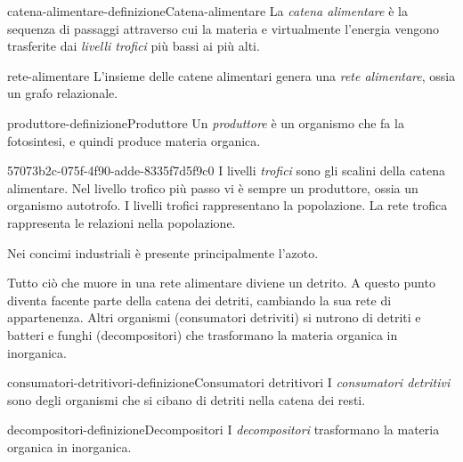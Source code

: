 \documentclass[preview]{standalone}
\begin{document}
\begin{snippetdefinition}{catena-alimentare-definizione}{Catena-alimentare}
    La \textit{catena alimentare} è la sequenza di passaggi
    attraverso cui la materia e virtualmente l'energia
    vengono trasferite dai \textit{livelli trofici} più bassi ai più alti.
\end{snippetdefinition}

\begin{snippet}{rete-alimentare}
    L'insieme delle catene alimentari genera una \textit{rete alimentare}, ossia un grafo relazionale.
\end{snippet}

\begin{snippetdefinition}{produttore-definizione}{Produttore}
    Un \textit{produttore} è un organismo che fa la fotosintesi, e quindi produce materia organica.
\end{snippetdefinition}

\begin{snippet}{57073b2c-075f-4f90-adde-8335f7d5f9c0}
    I livelli \textit{trofici} sono gli scalini della catena alimentare.
    Nel livello trofico più passo vi è sempre un produttore, ossia un organismo autotrofo.
    I livelli trofici rappresentano la popolazione. La rete trofica rappresenta le relazioni
    nella popolazione.


    Nei concimi industriali è presente principalmente l'azoto.

    Tutto ciò che muore in una rete alimentare diviene un detrito. A questo punto diventa
    facente parte della catena dei detriti, cambiando la sua rete di appartenenza.
    Altri organismi (consumatori detriviti) si nutrono di detriti e batteri e funghi (decompositori) che trasformano la materia organica in inorganica.
\end{snippet}

\begin{snippetdefinition}{consumatori-detritivori-definizione}{Consumatori detritivori}
    I \textit{consumatori detritivi} sono degli organismi che si cibano di detriti
    nella catena dei resti.
\end{snippetdefinition}

\begin{snippetdefinition}{decompositori-definizione}{Decompositori}
    I \textit{decompositori} trasformano la materia organica in inorganica.
\end{snippetdefinition}
\end{document}
